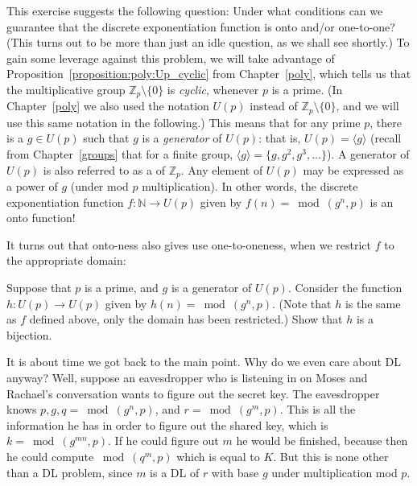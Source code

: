 This exercise suggests the following question:  Under what conditions can we guarantee that the discrete exponentiation function is onto and/or one-to-one? (This turns out to be more than just an idle question, as we shall see shortly.)  To gain some leverage against this problem, we will take advantage of   Proposition~\ref{proposition:poly:Up_cyclic} from Chapter~\ref{poly}, which tells us that the multiplicative group $\mathbb{Z}_p\setminus \{0\}$ is \emph{cyclic}, whenever $p$ is a prime. (In Chapter~\ref{poly} we also used the notation $U(p)$ instead of $\mathbb{Z}_p\setminus \{0\}$, and we will use this same notation in the following.) This means that for any prime $p$, there is a $g \in U(p)$  such that $g$ is a \emph{generator} of  $U(p)$: that is, $U(p) = \langle g \rangle$ (recall from Chapter~\ref{groups} that for a finite group, $\langle g \rangle = \{g, g^2, g^3, \ldots \}$). A generator of $U(p)$ is also referred to as a  of $\mathbb{Z}_p$. Any element of $U(p)$ may be expressed as a power of $g$ (under mod $p$ multiplication).  In other words, the discrete exponentiation function $f: \mathbb{N} \rightarrow U(p)$ given by $f(n) = \bmod(g^n,p)$ is an onto function!  

It turns out that onto-ness also gives use one-to-oneness, when we restrict $f$ to the appropriate domain:

\begin{exercise}{} 
Suppose that $p$ is a prime, and $g$ is a generator of $U(p)$.  Consider the function $h: U(p) \rightarrow U(p)$ given by $h(n) = \bmod(g^n,p)$.  (Note that $h$ is the same as $f$ defined above, only the domain has been restricted.)  Show that $h$ is a bijection.
\end{exercise}

It is about time we got back to the main point. Why do we even care about DL anyway? Well, suppose an eavesdropper who is listening in on Moses and Rachael's conversation wants to figure out the secret key. 
The eavesdropper knows $p, g, q=\bmod(g^n,p)$, and $r=\bmod(g^m,p)$.  This is all the information he has in order to figure out the shared key, which is  $k=\bmod(g^{mn},p)$. If he could figure out $m$ he would be finished, because then he could compute $\bmod(q^m,p)$ which is equal to $K$. But this is none other than a DL problem, since $m$ is a DL of $r$ with base $g$ under multiplication mod $p$.  


